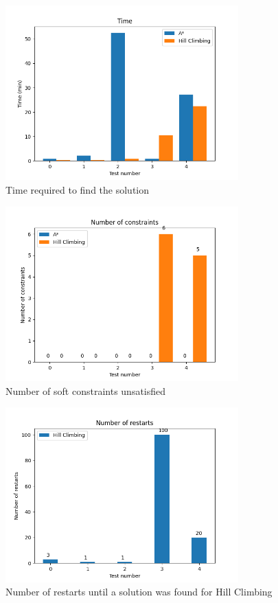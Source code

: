 \documentclass[runningheads]{paper}
\begin{document}
\begin{figure}[!]
\centering
\includegraphics[width=0.8\textwidth]{./images/times.png}
\caption{Time required to find the solution}
\label{fig:bipartite_complete_graphs}
\end{figure}

\begin{figure}[!]
\centering
\includegraphics[width=0.8\textwidth]{./images/constraints.png}
\caption{Number of soft constraints unsatisfied}
\label{fig:binary_tree_graphs}
\end{figure}

\begin{figure}[!]
\centering
\includegraphics[width=0.8\textwidth]{./images/restarts.png}
\caption{Number of restarts until a solution was found for Hill Climbing}
\label{fig:planar_graphs}
\end{figure}
\end{document}

